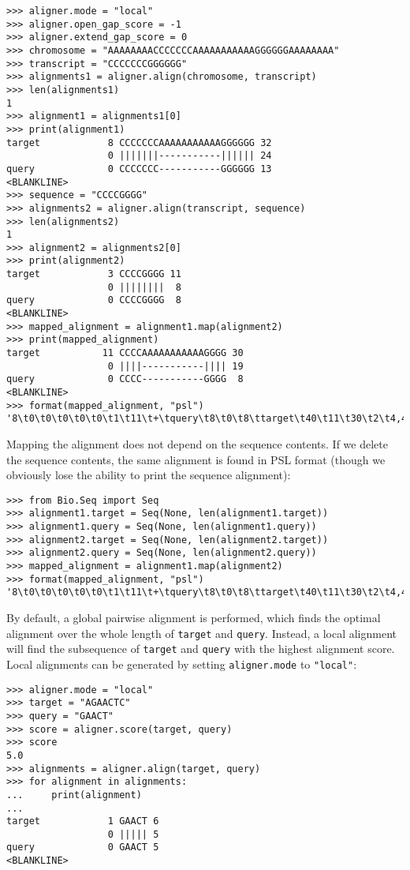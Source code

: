 \begin{verbatim}
>>> aligner.mode = "local"
>>> aligner.open_gap_score = -1
>>> aligner.extend_gap_score = 0
>>> chromosome = "AAAAAAAACCCCCCCAAAAAAAAAAAGGGGGGAAAAAAAA"
>>> transcript = "CCCCCCCGGGGGG"
>>> alignments1 = aligner.align(chromosome, transcript)
>>> len(alignments1)
1
>>> alignment1 = alignments1[0]
>>> print(alignment1)
target            8 CCCCCCCAAAAAAAAAAAGGGGGG 32
                  0 |||||||-----------|||||| 24
query             0 CCCCCCC-----------GGGGGG 13
<BLANKLINE>
>>> sequence = "CCCCGGGG"
>>> alignments2 = aligner.align(transcript, sequence)
>>> len(alignments2)
1
>>> alignment2 = alignments2[0]
>>> print(alignment2)
target            3 CCCCGGGG 11
                  0 ||||||||  8
query             0 CCCCGGGG  8
<BLANKLINE>
>>> mapped_alignment = alignment1.map(alignment2)
>>> print(mapped_alignment)
target           11 CCCCAAAAAAAAAAAGGGG 30
                  0 ||||-----------|||| 19
query             0 CCCC-----------GGGG  8
<BLANKLINE>
>>> format(mapped_alignment, "psl")
'8\t0\t0\t0\t0\t0\t1\t11\t+\tquery\t8\t0\t8\ttarget\t40\t11\t30\t2\t4,4,\t0,4,\t11,26,\n'
\end{verbatim}

Mapping the alignment does not depend on the sequence contents. If we delete
the sequence contents, the same alignment is found in PSL format (though we
obviously lose the ability to print the sequence alignment):

\begin{verbatim}
>>> from Bio.Seq import Seq
>>> alignment1.target = Seq(None, len(alignment1.target))
>>> alignment1.query = Seq(None, len(alignment1.query))
>>> alignment2.target = Seq(None, len(alignment2.target))
>>> alignment2.query = Seq(None, len(alignment2.query))
>>> mapped_alignment = alignment1.map(alignment2)
>>> format(mapped_alignment, "psl")
'8\t0\t0\t0\t0\t0\t1\t11\t+\tquery\t8\t0\t8\ttarget\t40\t11\t30\t2\t4,4,\t0,4,\t11,26,\n'
\end{verbatim}

By default, a global pairwise alignment is performed, which finds the optimal
alignment over the whole length of \verb+target+ and \verb+query+.
Instead, a local alignment will find the subsequence of
\verb+target+ and \verb+query+ with the highest alignment score.
Local alignments can be generated by setting \verb+aligner.mode+ to
\verb+"local"+:

\begin{verbatim}
>>> aligner.mode = "local"
>>> target = "AGAACTC"
>>> query = "GAACT"
>>> score = aligner.score(target, query)
>>> score
5.0
>>> alignments = aligner.align(target, query)
>>> for alignment in alignments:
...     print(alignment)
...
target            1 GAACT 6
                  0 ||||| 5
query             0 GAACT 5
<BLANKLINE>
\end{verbatim}

